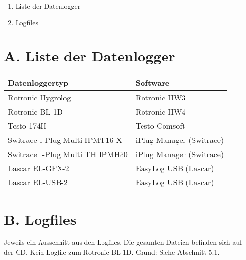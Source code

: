 
\addchap{\langanhang}
 

{\Large
\begin{enumerate}[label=\Alph*.]
	\item Liste der Datenlogger
	\item Logfiles
\end{enumerate}
}
\pagebreak


\section*{A. Liste der Datenlogger}
\begin{tabular}{|l|l|}
	\hline
	\textbf{Datenloggertyp} 		& \textbf{Software} \\ \hline
	Rotronic Hygrolog 	& Rotronic HW3 \\ \hline
	Rotronic BL-1D 		& Rotronic HW4 \\ \hline
	Testo 174H			& Testo Comsoft \\ \hline
	Switrace I-Plug Multi IPMT16-X & iPlug Manager (Switrace) \\ \hline
	Switrace I-Plug Multi TH IPMH30 & iPlug Manager (Switrace) \\ \hline
	Lascar EL-GFX-2		& EasyLog USB (Lascar) \\ \hline
	Lascar EL-USB-2		& EasyLog USB (Lascar) \\ \hline
\end{tabular}


\section*{B. Logfiles}
Jeweils ein Ausschnitt aus den Logfiles. Die gesamten Dateien befinden sich auf der CD. Kein Logfile zum Rotronic BL-1D. Grund: Siehe Abschnitt 5.1.

